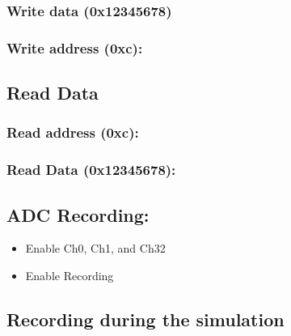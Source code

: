 \documentclass[letterpaper,10pt,english]{sphinxmanual}
\begin{document}
\subsubsection{Write data (0x12345678)}
\label{\detokenize{fpga_prototype:write-data-0x12345678}}
\sphinxAtStartPar
{}


\subsubsection{Write address (0xc):}
\label{\detokenize{fpga_prototype:write-address-0xc}}
\sphinxAtStartPar
{}


\subsection{Read Data}
\label{\detokenize{fpga_prototype:read-data}}

\subsubsection{Read address (0xc):}
\label{\detokenize{fpga_prototype:read-address-0xc}}
\sphinxAtStartPar
{}


\subsubsection{Read Data (0x12345678):}
\label{\detokenize{fpga_prototype:read-data-0x12345678}}
\sphinxAtStartPar
{}


\subsection{ADC Recording:}
\label{\detokenize{fpga_prototype:adc-recording}}\begin{itemize}
\item {} 
\sphinxAtStartPar
Enable Ch0, Ch1, and Ch32

\item {} 
\sphinxAtStartPar
Enable Recording

\end{itemize}

\sphinxAtStartPar
{}


\subsection{Recording during the simulation}
\label{\detokenize{fpga_prototype:recording-during-the-simulation}}
\sphinxAtStartPar
{}



\renewcommand{\indexname}{Index}
\printindex
\end{document}
